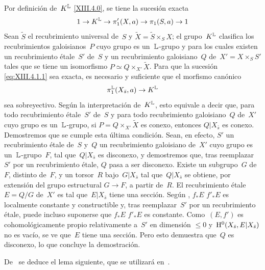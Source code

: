 Por
definición de~$K^{\mathbb L}$ \eqref{XIII.4.0}, se tiene la sucesión exacta
$$
1\to K^{\mathbb L} \to \pi_1'(X,a)\to \pi_1(S,a)\to 1
$$
Sean $\widetilde{S}$ el recubrimiento universal de~$S$ y
$\widetilde{X}=\widetilde{S}\times_SX$; el grupo~$K^{\mathbb L}$ clasifica los
recubrimientos galoisianos~$P$ cuyo grupo es un~$\mathbb L$-grupo y para los
cuales existen un recubrimiento étale~$S'$ de~$S$ y un recubrimiento
galoisiano~$Q$ de~$X'=X\times_SS'$ tales que se tiene un isomorfismo
$P\simeq Q\times_{X'}\widetilde{X}$. Para que la sucesión
\eqref{eq:XIII.4.1.1} sea exacta, es necesario y suficiente que el morfismo
canónico
$$
\pi_1^{\mathbb L}(X_{\bar{s}},a)\to K^{\mathbb L}
$$
sea sobreyectivo. Según la interpretación de~$K^{\mathbb L}$, esto equivale a
decir que, para todo recubrimiento étale~$S'$ de~$S$ y para todo
recubrimiento galoisiano~$Q$ de~$X'$ cuyo grupo es un~$\mathbb L$-grupo, si
$P=Q\times_{X'}\widetilde{X}$ es conexo, entonces $Q|X_{\bar{s}}$ es
conexo. Demostremos que se cumple esta última condición. Sean, en efecto,
$S'$ un recubrimiento étale de~$S$ y~$Q$ un recubrimiento galoisiano de~$X'$
cuyo grupo es un~$\mathbb L$-grupo~$F$, tal que~$Q|X_{\bar{s}}$ es disconexo, y
demostremos que, tras reemplazar~$S'$ por un recubrimiento étale, $Q$ pasa
a ser disconexo. Existe un subgrupo~$G$ de~$F$, distinto de~$F$, y un
torsor~$R$ bajo~$G|X_{\bar{s}}$ tal que~$Q|X_{\bar{s}}$ se obtiene, por
extensión del grupo estructural $G\to F$, a partir de~$R$. El recubrimiento
étale
$E=Q/G$ de~$X'$ es tal que~$E|X_{\bar{s}}$ tiene una sección. Según
,
{$f_*E$}
{$f'_*E$}
es localmente constante y constructible y, tras reemplazar~$S'$ por un
recubrimiento étale, puede incluso suponerse que
{$f_*E$}
{$f'_*E$}
es constante.
Como~$(E,f')$ es cohomológicamente propio relativamente a~$S'$ en dimensión
$\leqslant0$ y~$\mathrm H^0(X_{\bar{s}},E|X_{\bar{s}})$ no es vacío, se ve que~$E$
tiene una sección. Pero esto demuestra que~$Q$ es disconexo, lo que
concluye la demostración.

De~ se deduce el lema siguiente, que se utilizará
en~.
